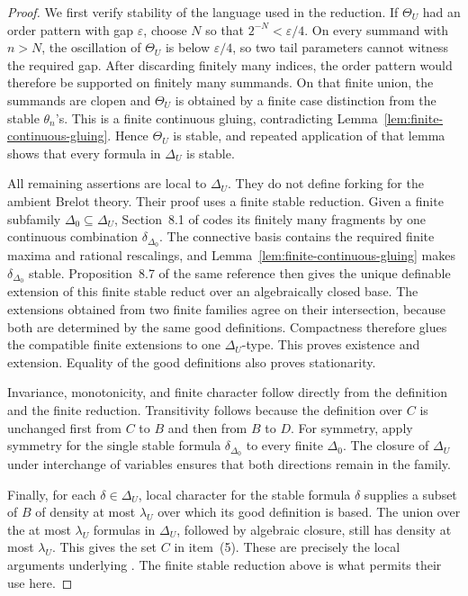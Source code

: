 \documentclass{amsart}
\theoremstyle{definition}
\theoremstyle{remark}
\numberwithin{equation}{section}
\begin{document}
\begin{proof}
We first verify stability of the language used in the reduction. If
$\Theta_U$ had an order pattern with gap $\varepsilon$, choose $N$
so that $2^{-N}<\varepsilon/4$. On every summand with $n>N$, the
oscillation of $\Theta_U$ is below $\varepsilon/4$, so two tail
parameters cannot witness the required gap. After discarding
finitely many indices, the order pattern would therefore be
supported on finitely many summands. On that finite union,
the summands are clopen and $\Theta_U$ is obtained by a finite
case distinction from the stable $\theta_n$'s. This is a finite
continuous gluing, contradicting
Lemma~\ref{lem:finite-continuous-gluing}. Hence $\Theta_U$ is stable,
and repeated application of that lemma shows that every formula in
$\Delta_U$ is stable.

All remaining assertions are local to $\Delta_U$. They do not define forking for the ambient Brelot theory. Their proof uses a finite stable reduction. Given a finite
subfamily $\Delta_0\subseteq\Delta_U$, Section~8.1 of
\cite{Yaacov2008CONTINUOUSFO} codes its finitely many fragments by
one continuous combination $\delta_{\Delta_0}$. The connective basis
contains the required finite maxima and rational rescalings, and
Lemma~\ref{lem:finite-continuous-gluing} makes
$\delta_{\Delta_0}$ stable. Proposition~8.7 of the same reference
then gives the unique definable extension of this finite stable
reduct over an algebraically closed base. The extensions obtained
from two finite families agree on their intersection, because both
are determined by the same good definitions. Compactness therefore
glues the compatible finite extensions to one
$\Delta_U$-type. This proves existence and extension. Equality of
the good definitions also proves stationarity.

Invariance, monotonicity, and finite character follow directly from
the definition and the finite reduction. Transitivity follows because
the definition over $C$ is unchanged first from $C$ to $B$ and then
from $B$ to $D$. For symmetry, apply symmetry for the single stable
formula $\delta_{\Delta_0}$ to every finite $\Delta_0$. The closure of
$\Delta_U$ under interchange of variables ensures that both
directions remain in the family.

Finally, for each $\delta\in\Delta_U$, local character for the stable
formula $\delta$ supplies a subset of $B$ of density at most
$\lambda_U$ over which its good definition is based. The union over
the at most $\lambda_U$ formulas in $\Delta_U$, followed by algebraic
closure, still has density at most $\lambda_U$. This gives the set
$C$ in item~(5). These are precisely the local arguments underlying
\cite[Lemma~8.11]{Yaacov2008CONTINUOUSFO}. The finite stable
reduction above is what permits their use here. 
\end{proof}
\end{document}
